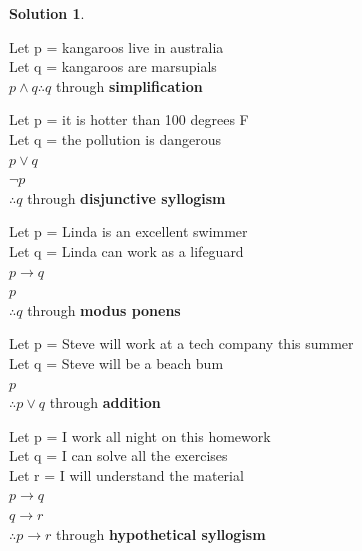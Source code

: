 \documentclass{article}
\theoremstyle{definition}
\newtheorem*{solution}{Solution}
\begin{document}
\begin{solution}\ \\
\begin{compactenum}
\item Let p = kangaroos live in australia\ \\
\indent Let q = kangaroos are marsupials \ \\
\indent $p \wedge q \therefore q$ through \textbf{simplification}\ \\

\item Let p = it is hotter than 100 degrees F \ \\
\indent Let q = the pollution is dangerous\ \\
\indent $p \vee q$\ \\
\indent $\neg p$\ \\
\indent $\therefore q$ through \textbf{disjunctive syllogism}\ \\

\item Let p = Linda is an excellent swimmer\ \\
\indent Let q = Linda can work as a lifeguard\ \\
\indent $p \to q$\ \\
\indent $p$\ \\
\indent $\therefore q$ through \textbf{modus ponens}\ \\

\item Let p = Steve will work at a tech company this summer\ \\
\indent Let q = Steve will be a beach bum\ \\
\indent $ p $\ \\
\indent $\therefore p \vee q$ through \textbf{addition}\ \\

\item Let p = I work all night on this homework\ \\
\indent Let q = I can solve all the exercises\ \\
\indent Let r = I will understand the material\ \\
\indent $p \to q$\ \\
\indent $q \to r$\ \\
\indent $\therefore p \to r$ through \textbf{hypothetical syllogism}\ \\

\end{compactenum}
\end{solution}
\end{document}
